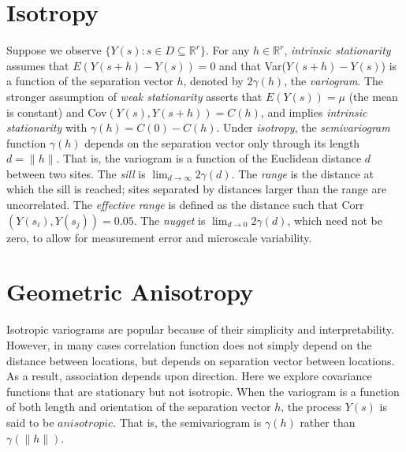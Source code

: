\documentclass[12pt,twoside]{dukestatscithesis}
\theoremstyle{definition}
\theoremstyle{definition}
\theoremstyle{definition}
\theoremstyle{remark}
\begin{document}
\section{Isotropy}\label{isotropy}

Suppose we observe \(\{Y(s): s \in D \subseteq \mathbb{R}^r\}\). For any
\(h \in \mathbb{R}^r\), \textit{intrinsic stationarity} assumes that
\(E(Y(s+h) - Y(s)) = 0\) and that Var(\(Y(s+h)-Y(s)\)) is a function of
the separation vector \(h\), denoted by \(2\gamma(h)\), the
\textit{variogram}. The stronger assumption of
\textit{weak stationarity} asserts that \(E(Y(s)) = \mu\) (the mean is
constant) and Cov\((Y(s), Y(s+h))=C(h)\), and implies
\textit{intrinsic stationarity} with \(\gamma(h)=C(0) - C(h)\). Under
\textit{isotropy}, the \textit{semivariogram} function \(\gamma(h)\)
depends on the separation vector only through its length
\(d=\lVert h \rVert\). That is, the variogram is a function of the
Euclidean distance \(d\) between two sites. The \textit{sill} is
\(\lim_{d\to\infty}2\gamma(d)\). The \textit{range} is the distance at
which the sill is reached; sites separated by distances larger than the
range are uncorrelated. The \textit{effective range} is defined as the
distance such that Corr\((Y(s_i), Y(s_j))=0.05\). The \textit{nugget} is
\(\lim_{d\to0}2\gamma(d)\), which need not be zero, to allow for
measurement error and microscale variability.

\section{Geometric Anisotropy}\label{geometric-anisotropy}

Isotropic variograms are popular because of their simplicity and
interpretability. However, in many cases correlation function does not
simply depend on the distance between locations, but depends on
separation vector between locations. As a result, association depends
upon direction. Here we explore covariance functions that are stationary
but not isotropic. When the variogram is a function of both length and
orientation of the separation vector \(h\), the process \(Y(s)\) is said
to be \(\textit{anisotropic}\). That is, the semivariogram is
\(\gamma(h)\) rather than \(\gamma(\lVert h \rVert)\).
\end{document}
